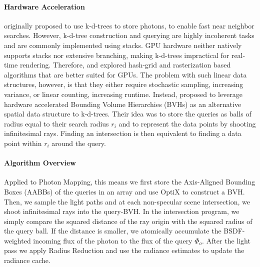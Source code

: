 \paragraph{Hardware Acceleration}
\textcite{jensen1996} originally proposed to use k-d-trees to store photons, to enable fast near neighbor searches.
However, k-d-tree construction and querying are highly incoherent tasks and are commonly implemented using stacks.
GPU hardware neither natively supports stacks nor extensive branching, making k-d-trees impractical for real-time rendering.
Therefore, \textcite{hachisuka2010} and \textcite{mara2013} explored hash-grid and rasterization based algorithms that are better suited for GPUs.
The problem with such linear data structures, however, is that they either require stochastic sampling, increasing variance, or linear counting, increasing runtime.
Instead, \textcite{evangelou2021} proposed to leverage hardware accelerated Bounding Volume Hierarchies (BVHs) as an alternative spatial data structure to k-d-trees.
Their idea was to store the queries as balls of radius equal to their search radius $r_i$ and to represent the data points by shooting infinitesimal rays.
Finding an intersection is then equivalent to finding a data point within $r_i$ around the query.

\paragraph{Algorithm Overview}
Applied to Photon Mapping, this means we first store the Axis-Aligned Bounding Boxes (AABBs) of the queries in an array and use OptiX to construct a BVH.
Then, we sample the light paths and at each non-specular scene intersection, we shoot infinitesimal rays into the query-BVH.
In the intersection program, we simply compare the squared distance of the ray origin with the squared radius of the query ball.
If the distance is smaller, we atomically accumulate the BSDF-weighted incoming flux of the photon to the flux of the query $\Phi_o$.
After the light pass we apply Radius Reduction and use the radiance estimates to update the radiance cache.

